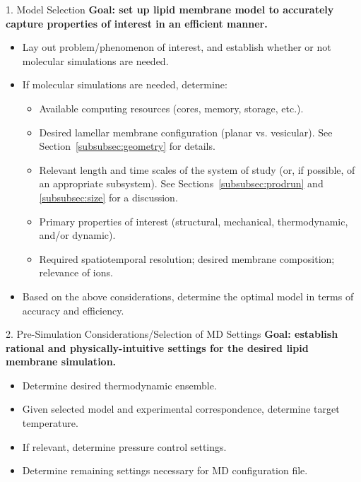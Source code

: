\documentclass[9pt,bestpractices,pubversion]{livecoms}
\begin{document}

\begin{Checklists*}[p!]

\begin{checklist}{1. Model Selection}
\textbf{Goal: set up lipid membrane model to accurately capture properties of interest in an efficient manner.}
\begin{itemize}
\item Lay out problem/phenomenon of interest, and establish whether or not molecular simulations are needed.
\item If molecular simulations are needed, determine:
	\begin{itemize}
	\item Available computing resources (cores, memory, storage, etc.).
	\item Desired lamellar membrane configuration (planar vs. vesicular). See Section~\ref{subsubsec:geometry} for details.
	\item Relevant length and time scales of the system of study (or, if possible, of an appropriate subsystem). See Sections~\ref{subsubsec:prodrun} and \ref{subsubsec:size} for a discussion.
	\item Primary properties of interest (structural, mechanical, thermodynamic, and/or dynamic).
	\item Required spatiotemporal resolution; desired membrane composition; relevance of ions.
	\end{itemize}
\item Based on the above considerations, determine the optimal model in terms of accuracy and efficiency.
\end{itemize}
\end{checklist}

\begin{checklist}{2. Pre-Simulation Considerations/Selection of MD Settings}
\textbf{Goal: establish rational and physically-intuitive settings for the desired lipid membrane simulation.}
\begin{itemize}
\item Determine desired thermodynamic ensemble.
\item Given selected model and experimental correspondence, determine target temperature.
\item If relevant, determine pressure control settings.
\item Determine remaining settings necessary for MD configuration file.
\end{itemize}
\end{checklist}


\end{Checklists*}
\end{document}
